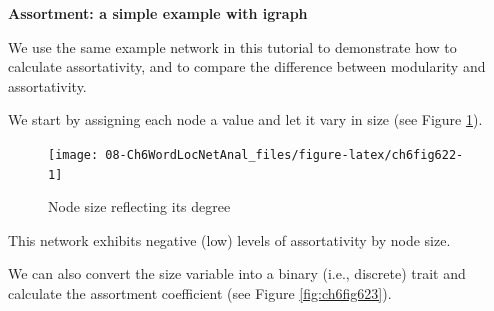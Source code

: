 \documentclass[
]{article}
\newenvironment{Shaded}{\begin{snugshade}}{\end{snugshade}}
\newcommand{\AttributeTok}[1]{\textcolor[rgb]{0.13,0.29,0.53}{#1}}
\newcommand{\CommentTok}[1]{\textcolor[rgb]{0.56,0.35,0.01}{\textit{#1}}}
\newcommand{\DecValTok}[1]{\textcolor[rgb]{0.00,0.00,0.81}{#1}}
\newcommand{\FunctionTok}[1]{\textcolor[rgb]{0.13,0.29,0.53}{\textbf{#1}}}
\newcommand{\NormalTok}[1]{#1}
\newcommand{\OtherTok}[1]{\textcolor[rgb]{0.56,0.35,0.01}{#1}}
\newcommand{\SpecialCharTok}[1]{\textcolor[rgb]{0.81,0.36,0.00}{\textbf{#1}}}
\newcommand{\StringTok}[1]{\textcolor[rgb]{0.31,0.60,0.02}{#1}}
\begin{document}
\textbf{Assortment: a simple example with igraph}

We use the same example network in this tutorial to demonstrate how to calculate assortativity, and to compare the difference between modularity and assortativity.

We start by assigning each node a value and let it vary in size (see Figure \ref{fig:ch6fig622}).

\begin{Shaded}
\end{Shaded}

\begin{figure}

{\centering \texttt{[image: 08-Ch6WordLocNetAnal\_files/figure-latex/ch6fig622-1]} 

}

\caption{Node size reflecting its degree}\label{fig:ch6fig622}
\end{figure}

\begin{Shaded}
\end{Shaded}

This network exhibits negative (low) levels of assortativity by node size.

We can also convert the size variable into a binary (i.e., discrete) trait and calculate the assortment coefficient (see Figure \ref{fig:ch6fig623}).

\begin{Shaded}
\end{Shaded}
\end{document}
